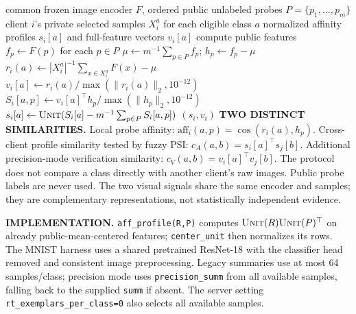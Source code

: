 \documentclass[11pt]{article}
\newcommand{\aff}{\mathrm{aff}}
\newcommand{\unit}{\textsc{Unit}}
\begin{document}
\begin{algorithm}[p]
\caption{Actual image-affinity construction supplied to fuzzy PSI}
\label{alg:affimpl}
\small\begin{algorithmic}[1]
\Require common frozen image encoder $F$, ordered public unlabeled probes $P=\{p_1,\ldots,p_m\}$
\Require client $i$'s private selected samples $X_i^a$ for each eligible class $a$
\Ensure normalized affinity profiles $s_i[a]$ and full-feature vectors $v_i[a]$
 \State compute public features $f_p\gets F(p)$ for each $p\in P$
 \State $\mu\gets m^{-1}\sum_{p\in P}f_p$; $h_p\gets f_p-\mu$
  \State $r_i(a)\gets |X_i^a|^{-1}\sum_{x\in X_i^a}F(x)-\mu$
  \State $v_i[a]\gets r_i(a)/\max(\|r_i(a)\|_2,10^{-12})$
   \State $S_i[a,p]\gets v_i[a]^\top h_p/\max(\|h_p\|_2,10^{-12})$
   \Comment{$\aff_i(a,p)$}
  \EndFor
  \State $s_i[a]\gets\unit(S_i[a]-m^{-1}\sum_{p\in P}S_i[a,p])$
 \EndFor
 \State \Return $(s_i,v_i)$
\EndProcedure
\Statex \hrulefill
\Statex \textbf{TWO DISTINCT SIMILARITIES.}
\Statex \quad Local probe affinity: $\aff_i(a,p)=\cos(r_i(a),h_p)$.
\Statex \quad Cross-client profile similarity tested by fuzzy PSI:
\Statex \qquad $c_A(a,b)=s_i[a]^\top s_j[b]$.
\Statex \quad Additional precision-mode verification similarity:
\Statex \qquad $c_V(a,b)=v_i[a]^\top v_j[b]$.
\Statex
\Statex The protocol does not compare a class directly with another client's
raw images. Public probe labels are never used. The two visual signals share
the same encoder and samples; they are complementary representations, not
statistically independent evidence.
\Statex
\Statex \raggedright\textbf{IMPLEMENTATION.} \texttt{aff\_profile(R,P)} computes
$\unit(R)\unit(P)^\top$ on already public-mean-centered features;
\texttt{center\_unit} then normalizes its rows. The MNIST harness uses a shared
pretrained ResNet-18 with the classifier head removed and consistent image
preprocessing. Legacy summaries use at most 64 samples/class; precision mode
uses \texttt{precision\_summ} from all available samples, falling back to the
supplied \texttt{summ} if absent. The server setting
\texttt{rt\_exemplars\_per\_class=0} also selects all available samples.
\end{algorithmic}\end{algorithm}
\end{document}
